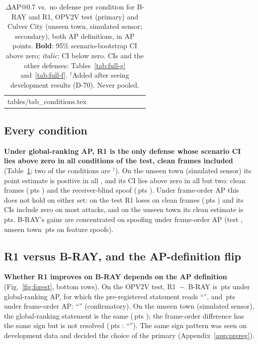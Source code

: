 \documentclass[conference]{IEEEtran}
\makeatletter
\newcommand{\pts}{\,pts}
\newcommand{\Cul}{unseen town (simulated sensor)}
\newcommand{\tabin}[1]{\@@input #1 }
\makeatother
\begin{document}
\begin{table}[!t]
\caption{$\Delta$AP@0.7 vs.\ no defense per condition for B-RAY and R1, OPV2V test (primary) and Culver City
(unseen town, simulated sensor; secondary), both AP definitions, in AP points. \textbf{Bold}: 95\%
scenario-bootstrap CI above zero; \textit{italic}: CI below zero. CIs and the other defenses:
Tables~\ref{tab:full-g} and~\ref{tab:full-f}. $^\dagger$Added after seeing development results (D-70).
Never pooled.}
\label{tab:conditions}
\centering
\footnotesize
\setlength{\tabcolsep}{4pt}
\begin{tabular}{lcccccccc}
\toprule
\tabin{tables/tab_conditions.tex}
\bottomrule
\end{tabular}
\end{table}

\subsection{Every condition}
\label{sec:every}
\textbf{Under global-ranking AP, R1 is the only defense whose scenario CI lies above zero in all
\NumConditions{} conditions of the test, clean frames included} (Table~\ref{tab:conditions}; two of the conditions
are $^\dagger$). On the \Cul{} its point estimate is positive in all \NumConditions, and its CI lies above zero in
all but two: clean frames (\CulDGlobCleanRONE\pts{} \CulCiGlobCleanRONE) and the receiver-blind spoof
(\CulDGlobSpoofBlindRONE\pts{} \CulCiGlobSpoofBlindRONE). Under frame-order AP this does not hold on either set:
on the test R1 loses on clean frames (\dFrameCleanRONE\pts{} \ciFrameCleanRONE) and its CIs include zero on most
attacks, and on the unseen town its clean estimate is \CulDFrameCleanRONE\pts. B-RAY's gains are concentrated on
spoofing under frame-order AP (test \dFrameSpoofFeatBRAY, unseen town \CulDFrameSpoofFeatBRAY\pts{} on feature
spoofs).

\subsection{R1 versus B-RAY, and the AP-definition flip}
\label{sec:apflip}
\textbf{Whether R1 improves on B-RAY depends on the AP definition} (Fig.~\ref{fig:forest}, bottom rows). On the
OPV2V test, R1~$-$~B-RAY is \VGlobRmB\pts{} \VGlobRmBCI{} under global-ranking AP, for which the pre-registered
statement reads ``\VGlobRmBStatement'', and \VFrameRmB\pts{} \VFrameRmBCI{} under frame-order AP:
``\VFrameRmBStatement'' (confirmatory). On the \Cul, the global-ranking statement is the same (\CulVGlobRmB\pts{}
\CulVGlobRmBCI); the frame-order difference has the same sign but is not resolved (\CulVFrameRmB\pts{}
\CulVFrameRmBCI: ``\CulVFrameRmBStatement''). The same sign pattern was seen on development data and decided the
choice of the primary (Appendix~\ref{app:prereg}).
\end{document}
